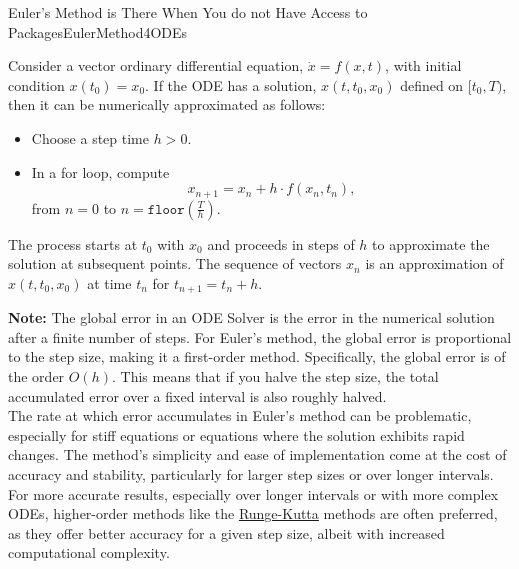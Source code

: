 \bigskip

\begin{methodColor}{Euler's Method is There When You do not Have Access to Packages}{EulerMethod4ODEs}

Consider a vector ordinary differential equation, $\dot x = f(x, t)$, with initial condition $x(t_0)=x_0$. If the ODE has a solution, $x(t, t_0, x_0)$ defined on $[t_0, T)$, then it can be numerically approximated as follows:
\begin{itemize}
    \item Choose a step time $h>0$.
    
    \item In a for loop, compute
\begin{equation}
    x_{n+1} = x_n + h \cdot f(x_n, t_n),
\end{equation}
from $n=0$ to $n=\texttt{floor}\left( \frac{T}{h} \right)$.
\end{itemize}
The process starts at \( t_0 \) with \( x_0 \) and proceeds in steps of \( h \) to approximate the solution at subsequent points.
The sequence of vectors \( x_n \) is an approximation of \( x(t, t_0, x_0) \) at time \( t_n \) for \( t_{n+1} = t_n + h \). 

\bigskip

\textbf{Note:} The global error in an ODE Solver is the error in the numerical solution after a finite number of steps. For Euler's method, the global error is proportional to the step size, making it a first-order method. Specifically, the global error is of the order $O(h)$. This means that if you halve the step size, the total accumulated error over a fixed interval is also roughly halved.\\

The rate at which error accumulates in Euler's method can be problematic, especially for stiff equations or equations where the solution exhibits rapid changes. The method's simplicity and ease of implementation come at the cost of accuracy and stability, particularly for larger step sizes or over longer intervals.  For more accurate results, especially over longer intervals or with more complex ODEs, higher-order methods like the \href{https://docs.sciml.ai/DiffEqDocs/stable/solvers/ode_solve/#Explicit-Runge-Kutta-Methods}{Runge-Kutta} methods are often preferred, as they offer better accuracy for a given step size, albeit with increased computational complexity.
   
\end{methodColor}

